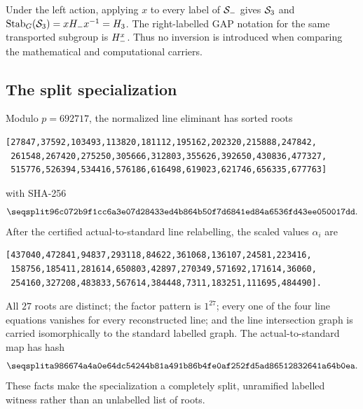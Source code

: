 Under the left action, applying $x$ to every label of $\mathcal{S}_-$ gives
$\mathcal{S}_3$ and
$\operatorname{Stab}_G(\mathcal{S}_3)=xH_{-} x^{-1}=H_{3}$.  The right-labelled GAP notation
for the same transported subgroup is $H_{-}^x$.  Thus no inversion is
introduced when comparing the mathematical and computational carriers.

\subsection{The split specialization}

Modulo $p=692717$, the normalized line eliminant has sorted roots
\begingroup\scriptsize
\begin{verbatim}
[27847,37592,103493,113820,181112,195162,202320,215888,247842,
 261548,267420,275250,305666,312803,355626,392650,430836,477327,
 515776,526394,534416,576186,616498,619023,621746,656335,677763]
\end{verbatim}
\endgroup
with SHA-256
\[
\hexsha{96c072b9f1cc6a3e07d28433ed4b864b50f7d6841ed84a6536fd43ee050017dd}.
\]
After the certified actual-to-standard line relabelling, the scaled values
$\alpha_i$ are
\begingroup\scriptsize
\begin{verbatim}
[437040,472841,94837,293118,84622,361068,136107,24581,223416,
 158756,185411,281614,650803,42897,270349,571692,171614,36060,
 254160,327208,483833,567614,384448,7311,183251,111695,484490].
\end{verbatim}
\endgroup
All $27$ roots are distinct; the factor pattern is $1^{27}$; every one of the
four line equations vanishes for every reconstructed line; and the line
intersection graph is carried isomorphically to the standard labelled graph.
The actual-to-standard map has hash
\[
\hexsha{a986674a4a0e64dc54244b81a491b86b4fe0af252fd5ad86512832641a64b0ea}.
\]
These facts make the specialization a completely split, unramified labelled
witness rather than an unlabelled list of roots.

